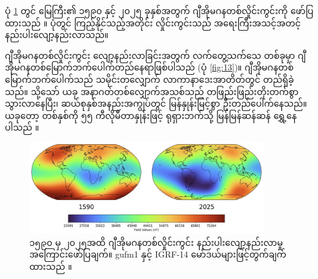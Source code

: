 \documentclass[10pt,twocolumn,letterpaper]{article}
\begin{document}
ပုံ \ref{fig:14} တွင် မြေကြီး၏ ၁၅၉၀ နှင့် ၂၀၂၅ ခုနှစ်အတွက် ဂျီအိုမဂနတစ်လှိုင်းကွင်းကို ဖော်ပြထားသည် \cite{125,126}။ ပုံတွင် ကြည့်နိုင်သည့်အတိုင်း လှိုင်းကွင်းသည် အရေးကြီးအသင့်အတင့် နည်းပါးလျော့နည်းလာသည်။

ဂျီအိုမဂနတစ်လှိုင်းကွင်း လျော့နည်းလာခြင်းအတွက် လက်တွေ့သက်သေ တစ်ခုမှာ ဂျီအိုမဂနတစ်မြောက်ဘက်ပေါက်တည်နေရာဖြစ်ပါသည် (ပုံ \ref{fig:13})။ ဂျီအိုမဂနတစ်မြောက်ဘက်ပေါက်သည် သမိုင်းတလျှောက် လာကာနာဒေးအာတိတ်တွင် တည်ရှိခဲ့သည်။ သို့သော် ယခု အနာဂတ်တစ်လျှောက်အသစ်သည် တဖြည်းဖြည်းတိုးတက်စွာ သွားလာနေပြီး၊ ဆယ်စုနှစ်အနည်းအကျွပ်တွင် မြန်နှုန်းမြင့်စွာ ဦးတည်ပေါက်နေသည်။ ယခုတော့ တစ်နှစ်ကို ၅၅ ကီလိုမီတာနှုန်းဖြင့် ရုရှားဘက်သို့ မြန်မြန်ဆန်ဆန် ရွှေ့နေပါသည် \cite{124}။

\begin{figure}[t]
\begin{center}
\includegraphics[width=0.9\textwidth]{saa.jpg}
\end{center}
   \caption{၁၅၉၀ မှ ၂၀၂၅အထိ ဂျီအိုမဂနတစ်လှိုင်းကွင်း နည်းပါးလျော့နည်းလာမှုအကြောင်းဖော်ပြချက်။ gufm1 နှင့် IGRF-14 မော်ဒယ်များဖြင့်တွက်ချက်ထားသည် \cite{125,126}။}
\label{fig:14}
\end{figure}
\end{document}
